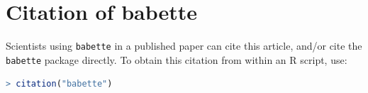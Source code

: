 \documentclass{article}
\begin{document}
\section{Citation of babette}

Scientists using \verb;babette; in a published paper can cite this
article, and/or cite the \verb;babette; package 
directly. To obtain this citation from within an R script, use:

\begin{lstlisting}[language=R]
> citation("babette")
\end{lstlisting}



\end{document}
